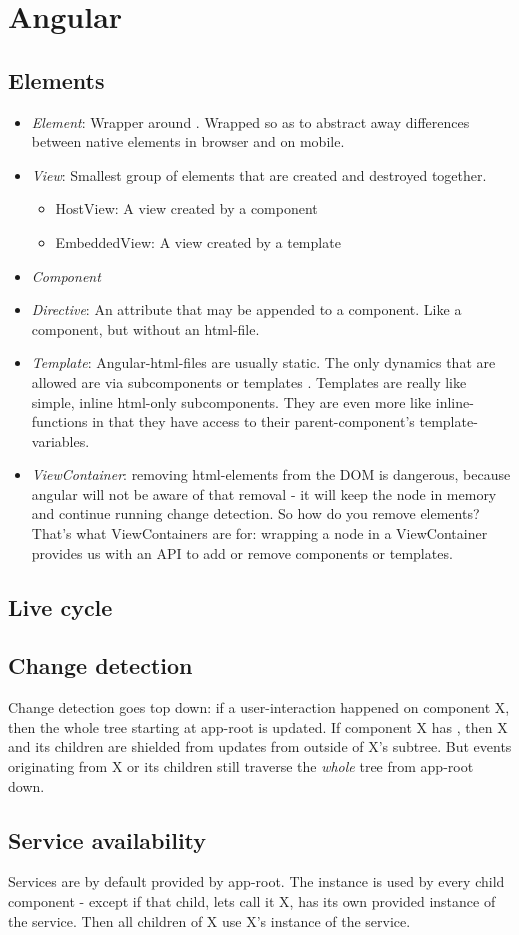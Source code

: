 \section{Angular}


\subsection{Elements}

\begin{itemize}
    \item \emph{Element}: Wrapper around . Wrapped so as to abstract away differences between native elements in browser and on mobile.
    \item \emph{View}: Smallest group of elements that are created and destroyed together.
        \begin{itemize}
            \item HostView: A view created by a component
            \item EmbeddedView: A view created by a template
        \end{itemize}
    \item \emph{Component}
    \item \emph{Directive}: An attribute that may be appended to a component. Like a component, but without an html-file.
    \item \emph{Template}: Angular-html-files are usually static. The only dynamics that are allowed are via subcomponents or templates . Templates are really like simple, inline html-only subcomponents. They are even more like inline-functions in that they have access to their parent-component's template-variables.
    \item \emph{ViewContainer}: removing html-elements from the DOM is dangerous, because angular will not be aware of that removal - it will keep the node in memory and continue running change detection. So how do you remove elements? That's what ViewContainers are for: wrapping a node in a ViewContainer provides us with an API to add or remove components or templates.
\end{itemize}

\subsection{Live cycle}


\subsection{Change detection}
Change detection goes top down: if a user-interaction happened on component X, then the whole tree starting at app-root is updated.
If component X has , then X and its children are shielded from updates from outside of X's subtree. But events originating from X or its children still traverse the \emph{whole} tree from app-root down.

\subsection{Service availability}
Services are by default provided by app-root. The instance is used by every child component - except if that child, lets call it X, has its own provided instance of the service. Then all children of X use X's instance of the service.